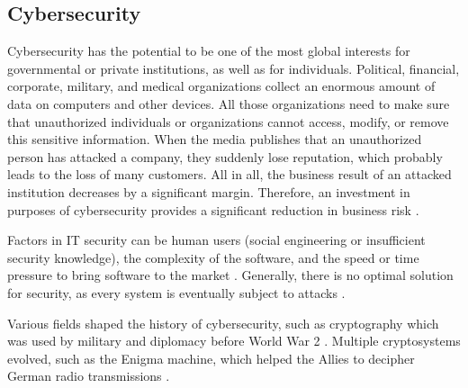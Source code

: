\subsection{Cybersecurity}
\label{subsec:02_cybersecurity}

Cybersecurity has the potential to be one of the most global interests for governmental or private institutions, as well as for individuals. Political, financial, corporate, military, and medical organizations collect an enormous amount of data on computers and other devices. All those organizations need to make sure that unauthorized individuals or organizations cannot access, modify, or remove this sensitive information. When the media publishes that an unauthorized person has attacked a company, they suddenly lose reputation, which probably leads to the loss of many customers. All in all, the business result of an attacked institution decreases by a significant margin. Therefore, an investment in purposes of cybersecurity provides a significant reduction in business risk \cite{Bishop2003}.

Factors in IT security can be human users (social engineering or insufficient security knowledge), the complexity of the software, and the speed or time pressure to bring software to the market \cite{Bishop2003}. Generally, there is no optimal solution for security, as every system is eventually subject to attacks \cite{Bishop2003}.

Various fields shaped the history of cybersecurity, such as cryptography which was used by military and diplomacy before World War 2 \cite{Bishop2003}. Multiple cryptosystems evolved, such as the Enigma machine, which helped the Allies to decipher German radio transmissions \cite{Kahn1991}.

